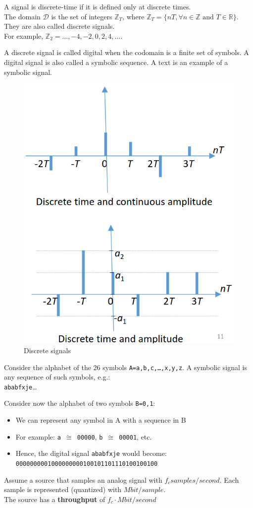 \begin{paracol}{2}
   \colfill   
   \begin{definition}
      A signal is discrete-time if it is defined only at discrete times.\\
      The domain $\mathcal{D}$ is the set of integers $\mathbb{Z}_T$,
      where $\mathbb{Z}_T = \{nT, \forall n \in \mathbb{Z} \text{ and } T \in \mathbb{R}\}$.
      They are also called discrete signals.\\
      For example, $\mathbb{Z}_2 = \ldots, -4, -2, 0, 2, 4, \ldots$.
      
      A discrete signal is called digital when the codomain is a finite set of symbols.
      A digital signal is also called a symbolic sequence.
      A text is an example of a symbolic signal.
      
   \end{definition}
   \colfill

   \switchcolumn
   \begin{figure}[htbp]
      \centering
      \includegraphics[width=0.4\columnwidth]{images/signals_discrete.png}
      \caption{Discrete signals}
      \label{fig:signals_discrete}
   \end{figure}
\end{paracol}


\begin{definition}
   Consider the alphabet of the 26 symbols \texttt{A={a,b,c,\dots,x,y,z}}.
   A symbolic signal is any sequence of such symbols, e.g.:\\
   \texttt{ababfxje}\dots
   
   Consider now the alphabet of two symbols \texttt{B={0,1}}:
   \begin{itemize}
      \item We can represent any symbol in A with a sequence in B
      \item For example: \texttt{a $\cong$ 00000}, \texttt{b $\cong$ 00001}, etc.
      \item Hence, the digital signal \texttt{ababfxje} would become:\\
      \texttt{0000000001000000000100101101110100100100}
   \end{itemize}

   Assume a source that samples an analog signal with $f_c samples/second$.
   Each sample is represented (quantized) with $M bit/sample$.\\
   The source has a \textbf{throughput} of $f_c \cdot M bit/second$


\end{definition}

